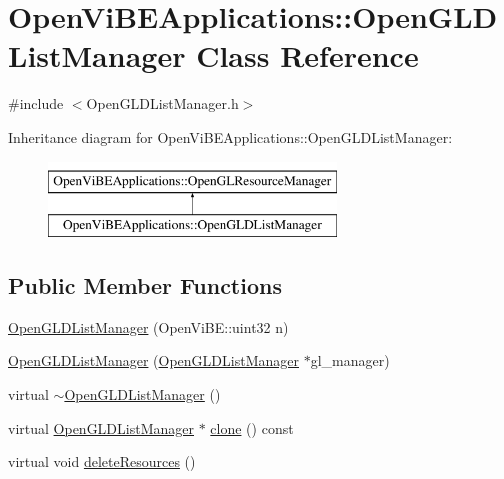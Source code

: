 \hypertarget{classOpenViBEApplications_1_1OpenGLDListManager}{
\section{OpenViBEApplications::OpenGLDListManager Class Reference}
\label{classOpenViBEApplications_1_1OpenGLDListManager}
}


{\ttfamily \#include $<$OpenGLDListManager.h$>$}

Inheritance diagram for OpenViBEApplications::OpenGLDListManager:\begin{figure}[H]
\begin{center}
\leavevmode
\includegraphics[height=2.000000cm]{classOpenViBEApplications_1_1OpenGLDListManager}
\end{center}
\end{figure}
\subsection*{Public Member Functions}
\begin{DoxyCompactItemize}
\item 
\hyperlink{classOpenViBEApplications_1_1OpenGLDListManager_af5e7835f2db95c23ab9345bcc1695982}{OpenGLDListManager} (OpenViBE::uint32 n)
\item 
\hyperlink{classOpenViBEApplications_1_1OpenGLDListManager_acabb18302335158d52d9be533ce5e94a}{OpenGLDListManager} (\hyperlink{classOpenViBEApplications_1_1OpenGLDListManager}{OpenGLDListManager} $\ast$gl\_\-manager)
\item 
virtual \hyperlink{classOpenViBEApplications_1_1OpenGLDListManager_ad2e4382704ac00f3ed32b4696e8ed85d}{$\sim$OpenGLDListManager} ()
\item 
virtual \hyperlink{classOpenViBEApplications_1_1OpenGLDListManager}{OpenGLDListManager} $\ast$ \hyperlink{classOpenViBEApplications_1_1OpenGLDListManager_a0380af00e81545d95495da326c73a7c6}{clone} () const 
\item 
virtual void \hyperlink{classOpenViBEApplications_1_1OpenGLDListManager_aef0cc35e86caae475ef6c76ae7e83930}{deleteResources} ()
\end{DoxyCompactItemize}
